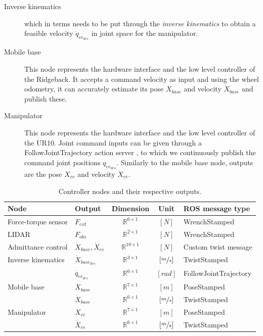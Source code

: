 \begin{description}
  \item[Inverse kinematics] which in terms needs to be put through the \emph{inverse kinematics} to obtain a feasible velocity $\dot{q}_{ee_{des}}$ in joint space for the manipulator.
  \item[Mobile base] This node represents the hardware interface and the low level controller of the Ridgeback. It accepts a command velocity as input and using the wheel odometry, it can accurately estimate its pose $X_{base}$ and velocity $\dot{X}_{base}$ and publish these.
  \item[Manipulator] This node represents the hardware interface and the low level controller of the UR10. Joint command inputs can be given through a FollowJointTrajectory action server \citep{rosJointTrajectory}, to which we continuously publish the command joint positions $q_{ee_{des}}$. Similarly to the mobile base node, outputs are the pose $X_{ee}$ and velocity $\dot{X}_{ee}$.
\end{description}

\begin{table}[h]
\begin{center}
 \caption{Controller nodes and their respective outputs.}\vspace{1ex}
 \label{tab:controller_nodes}
 \begin{tabular}{l|lccl}
 \hline
Node & Output & Dimension & Unit & ROS message type \\ \hline \hline
Force-torque sensor & $F_{ext}$ & $\mathbb{R}^{6 \times 1}$ & $[N]$ & WrenchStamped \\
LIDAR & $F_{obs}$ & $\mathbb{R}^{2 \times 1}$ & $[N]$ & WrenchStamped \\
Admittance control & $\dot{X}_{base},\dot{X}_{ee}$ & $\mathbb{R}^{10 \times 1}$ & $[N]$ & Custom twist message \\
Inverse kinematics & $\dot{X}_{base_{des}}$ & $\mathbb{R}^{3 \times 1}$  & $[\sfrac{m}{s}]$ & TwistStamped \\
& $\dot{q}_{ee_{des}}$&$\mathbb{R}^{6 \times 1}$ & $[rad]$ & FollowJointTrajectory\\
Mobile base & $X_{base}$ & $\mathbb{R}^{7 \times 1}$ & $[m]$ & PoseStamped \\
& $\dot{X}_{base}$ & $\mathbb{R}^{6 \times 1}$ & $[\sfrac{m}{s}]$ & TwistStamped \\
Manipulator & $X_{ee}$ & $\mathbb{R}^{7 \times 1}$ & $[m]$ & PoseStamped \\
& $\dot{X}_{ee}$ & $\mathbb{R}^{6 \times 1}$ & $[\sfrac{m}{s}]$ & TwistStamped \\


 \hline
 \end{tabular}
\end{center}
\end{table}


